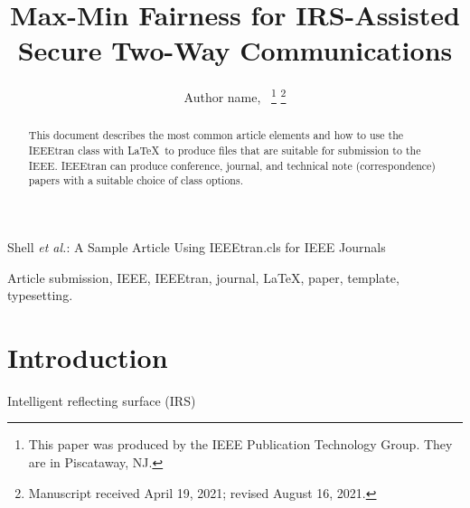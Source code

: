 \documentclass[lettersize,journal]{IEEEtran}
\begin{document}
\title{Max-Min Fairness for IRS-Assisted Secure Two-Way Communications}

\author{Author name,~
\thanks{This paper was produced by the IEEE Publication Technology Group. They are in Piscataway, NJ.}%
\thanks{Manuscript received April 19, 2021; revised August 16, 2021.}}

%
{Shell \MakeLowercase{\textit{et al.}}: A Sample Article Using IEEEtran.cls for IEEE Journals}


\maketitle

\begin{abstract}
This document describes the most common article elements and how to use the IEEEtran class with \LaTeX \ to produce files that are suitable for submission to the IEEE.  IEEEtran can produce conference, journal, and technical note (correspondence) papers with a suitable choice of class options. 
\end{abstract}

\begin{IEEEkeywords}
Article submission, IEEE, IEEEtran, journal, \LaTeX, paper, template, typesetting.
\end{IEEEkeywords}

\section{Introduction}

Intelligent reflecting surface (IRS)

%
%
%

\end{document}
